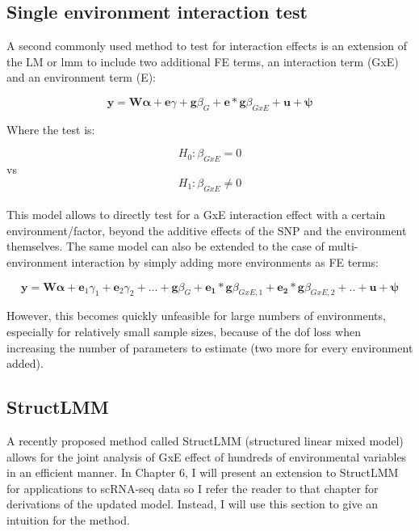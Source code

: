 \subsection{Single environment interaction test}

A second commonly used method to test for interaction effects is an extension of the LM or \gls{lmm} to include two additional FE terms, an interaction term (GxE) and an environment term (E):

\begin{equation}\label{eq:Interaction_test_FE_LMM}
 \mathbf{y} =  \mathbf{W}\boldsymbol{\alpha} + \mathbf{e}\gamma  + \mathbf{g}\beta_G + \mathbf{e}*\mathbf{g}\beta_{GxE} + \mathbf{u} + \boldsymbol{\psi} 
\end{equation}

Where the test is:

\begin{equation}
 H_{0}: \beta_{GxE}=0 
\end{equation}
vs
\begin{equation}
 H_{1}: \beta_{GxE} \neq 0 
\end{equation}\\

This model allows to directly test for a GxE interaction effect with a certain environment/factor, beyond the additive effects of the SNP and the environment themselves. 
The same model can also be extended to the case of multi-environment interaction by simply adding more environments as FE terms:

\begin{equation}\label{eq:multi_interaction_test_FE_LMM}
 \mathbf{y} =  \mathbf{W}\boldsymbol{\alpha} + \mathbf{e}_1\gamma_1 + \mathbf{e}_2\gamma_2 + ...  + \mathbf{g}\beta_G + \mathbf{e_1}*\mathbf{g}\beta_{GxE,1}+ \mathbf{e_2}*\mathbf{g}\beta_{GxE,2} + .. + \mathbf{u} + \boldsymbol{\psi} 
\end{equation}

However, this becomes quickly unfeasible for large numbers of environments, especially for relatively small sample sizes, because of the dof loss when increasing the number of parameters to estimate (two more for every environment added).


\subsection{StructLMM}

A recently proposed method called StructLMM (structured linear mixed model) allows for the joint analysis of GxE effect of hundreds of environmental variables \cite{moore2019linear} in an efficient manner.
In Chapter 6, I will present an extension to StructLMM for applications to scRNA-seq data so I refer the reader to that chapter for derivations of the updated model.
Instead, I will use this section to give an intuition for the method.\\

